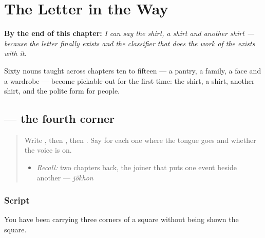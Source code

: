 
\chapter{The Letter in the Way}
\label{ch:bn-the-letter-in-the-way}

\begin{chapteropening}
\textbf{By the end of this chapter:} \emph{I can say the shirt, a shirt and another shirt — because the letter  finally exists and the classifier that does the work of the exists with it.}

Sixty nouns taught across chapters ten to fifteen — a pantry, a family, a face and a wardrobe — become pickable-out for the first time: the shirt, a shirt, another shirt, and the polite form for people.
\end{chapteropening}

\section[\texorpdfstring{\bn{ট} (ṭô)}{ট (ṭô)}]{ — the fourth corner}

\label{lesson:BN-W05-tta}



\begin{quote}
Write \textbf{}, then \textbf{}, then \textbf{}. Say for each one where the tongue goes and whether the voice is on.

\begin{itemize}
\raggedright
  \item \emph{Recall:} two chapters back, the joiner that puts one event beside another — \emph{jôkhon}
\end{itemize}
\end{quote}

\subsection*{Script}
\begin{quote}
\end{quote}

You have been carrying three corners of a square without being shown the square.

